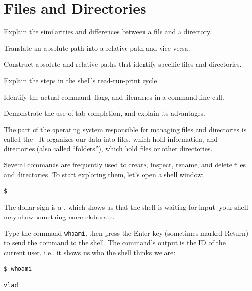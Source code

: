 \documentclass{book}
\begin{document}
\section{Files and Directories}

\begin{objectives}
\begin{swcitemize}
\item
  Explain the similarities and differences between a file and a
  directory.
\item
  Translate an absolute path into a relative path and vice versa.
\item
  Construct absolute and relative paths that identify specific files and
  directories.
\item
  Explain the steps in the shell's read-run-print cycle.
\item
  Identify the actual command, flags, and filenames in a command-line
  call.
\item
  Demonstrate the use of tab completion, and explain its advantages.
\end{swcitemize}
\end{objectives}

The part of the operating system responsible for managing files and
directories is called the . It
organizes our data into files, which hold information, and directories
(also called ``folders''), which hold files or other directories.

Several commands are frequently used to create, inspect, rename, and
delete files and directories. To start exploring them, let's open a
shell window:

\begin{verbatim}
$
\end{verbatim}

The dollar sign is a , which shows us that
the shell is waiting for input; your shell may show something more
elaborate.

Type the command \texttt{whoami}, then press the Enter key (sometimes
marked Return) to send the command to the shell. The command's output is
the ID of the current user, i.e., it shows us who the shell thinks we
are:

\begin{verbatim}
$ whoami
\end{verbatim}

\begin{verbatim}
vlad
\end{verbatim}
\end{document}
